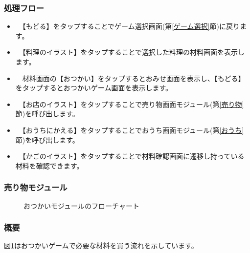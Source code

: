 \documentclass[a4j]{jarticle}
\begin{document}
\subsubsection*{処理フロー}
\begin{itemize}
\item　【もどる】をタップすることでゲーム選択画面(第\ref{ゲーム選択}節)に戻ります。
\item　【料理のイラスト】をタップすることで選択した料理の材料画面を表示します。
\item　材料画面の【おつかい】をタップするとおみせ画面を表示し、【もどる】をタップするとおつかいゲーム画面を表示します。
\item　【お店のイラスト】をタップすることで売り物画面モジュール(第\ref{売り物}節)を呼び出します。
\item　【おうちにかえる】をタップすることでおうち画面モジュール(第\ref{おうち}節)を呼び出します。
\item　【かごのイラスト】をタップすることで材料確認画面に遷移し持っている材料を確認できます。
\end{itemize}


\newpage
\subsubsection{売り物モジュール\label{売り物}}
\begin{figure}[H]
    \begin{center}
    \caption {おつかいモジュールのフローチャート}
    \label{urimono}
    \end{center}
\end{figure}

\subsubsection*{概要}
図\ref{urimono}はおつかいゲームで必要な材料を買う流れを示しています。
\end{document}
